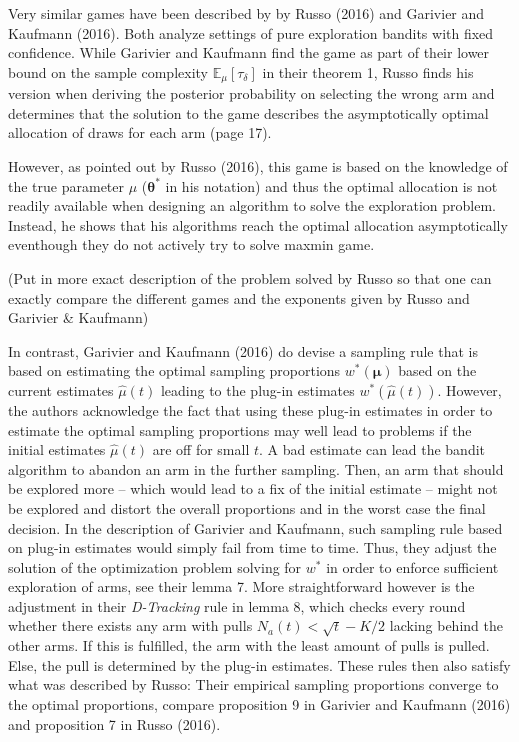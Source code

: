 \documentclass[12pt,]{article}
\begin{document}
Very similar games have been described by by Russo (2016) and Garivier
and Kaufmann (2016). Both analyze settings of pure exploration bandits
with fixed confidence. While Garivier and Kaufmann find the game as part
of their lower bound on the sample complexity
\(\mathbb{E}_{\mu}[\tau_{\delta}]\) in their theorem 1, Russo finds his
version when deriving the posterior probability on selecting the wrong
arm and determines that the solution to the game describes the
asymptotically optimal allocation of draws for each arm (page 17).

However, as pointed out by Russo (2016), this game is based on the
knowledge of the true parameter \(\mu\) (\(\bm{\theta}^*\) in his
notation) and thus the optimal allocation is not readily available when
designing an algorithm to solve the exploration problem. Instead, he
shows that his algorithms reach the optimal allocation asymptotically
eventhough they do not actively try to solve maxmin game.

(Put in more exact description of the problem solved by Russo so that
one can exactly compare the different games and the exponents given by
Russo and Garivier \& Kaufmann)

In contrast, Garivier and Kaufmann (2016) do devise a sampling rule that
is based on estimating the optimal sampling proportions
\(w^*(\bm{\mu})\) based on the current estimates \(\hat{\mu}(t)\)
leading to the plug-in estimates \(w^*(\hat{\mu}(t))\). However, the
authors acknowledge the fact that using these plug-in estimates in order
to estimate the optimal sampling proportions may well lead to problems
if the initial estimates \(\hat{\mu}(t)\) are off for small \(t\). A bad
estimate can lead the bandit algorithm to abandon an arm in the further
sampling. Then, an arm that should be explored more -- which would lead
to a fix of the initial estimate -- might not be explored and distort
the overall proportions and in the worst case the final decision. In the
description of Garivier and Kaufmann, such sampling rule based on
plug-in estimates would simply fail from time to time. Thus, they adjust
the solution of the optimization problem solving for \(w^*\) in order to
enforce sufficient exploration of arms, see their lemma 7. More
straightforward however is the adjustment in their \emph{D-Tracking}
rule in lemma 8, which checks every round whether there exists any arm
with pulls \(N_a(t) < \sqrt{t} - K/2\) lacking behind the other arms. If
this is fulfilled, the arm with the least amount of pulls is pulled.
Else, the pull is determined by the plug-in estimates. These rules then
also satisfy what was described by Russo: Their empirical sampling
proportions converge to the optimal proportions, compare proposition 9
in Garivier and Kaufmann (2016) and proposition 7 in Russo (2016).
\end{document}
